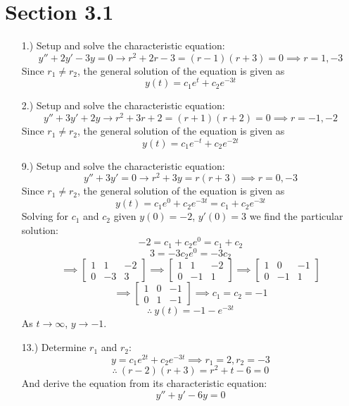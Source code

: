 \documentclass[12pt]{article}
\newcommand{\bracks}[1]{\left[#1\right]}
\begin{document}
\pagestyle{fancy}
\fancyhead{}

\normalsize
\section*{Section 3.1}
\begin{itemize}
    \item [1.)] Setup and solve the characteristic equation:
    \[y''+2y'-3y=0\to r^2+2r-3=(r-1)(r+3)=0\implies r=1,-3\]
    Since $r_1\neq r_2$, the general solution of the equation is given as
    \[y(t)=c_1e^t+c_2e^{-3t}\]

    \item [2.)] Setup and solve the characteristic equation:
    \[y''+3y'+2y\to r^2+3r+2=(r+1)(r+2)=0\implies r=-1,-2\]
    Since $r_1\neq r_2$, the general solution of the equation is given as
    \[y(t)=c_1e^{-t}+c_2e^{-2t}\]

    \item [9.)] Setup and solve the characteristic equation:
    \[y''+3y'=0\to r^2+3y=r(r+3)\implies r=0,-3\]
    Since $r_1\neq r_2$, the general solution of the equation is given as
    \[y(t)=c_1e^0+c_2e^{-3t}=c_1+c_2e^{-3t}\]
    Solving for $c_1$ and $c_2$ given $y(0)=-2$, $y'(0)=3$ we find the particular solution:
    \[-2=c_1+c_2e^0=c_1+c_2\]
    \[3=-3c_2e^0=-3c_2\]
    \[\implies\bracks{\begin{array}{rr|r}
        1 & 1 & -2\\
        0 & -3 & 3
    \end{array}}\implies\bracks{\begin{array}{rr|r}
        1 & 1 & -2\\
        0 & -1 & 1
    \end{array}}\implies\bracks{\begin{array}{rr|r}
        1 & 0 & -1\\
        0 & -1 & 1
    \end{array}}\]
    \[\implies\bracks{\begin{array}{rr|r}
        1 & 0 & -1\\
        0 & 1 & -1
    \end{array}}\implies c_1=c_2=-1\]
    \[\therefore\ y(t)=-1-e^{-3t}\]
    As $t\to\infty$, $y\to-1$.

    \item [13.)] Determine $r_1$ and $r_2$:
    \[y=c_1e^{2t}+c_2e^{-3t}\implies r_1=2,r_2=-3\]
    \[\therefore\ (r-2)(r+3)=r^2+t-6=0\]
    And derive the equation from its characteristic equation:
    \[y''+y'-6y=0\]

\end{itemize}
\end{document}
